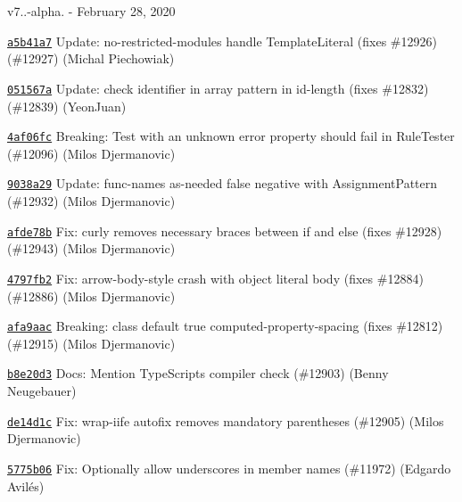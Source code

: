 v7..-\/alpha. -\/ February 28, 2020


\begin{DoxyItemize}
\item \href{https://github.com/eslint/eslint/commit/a5b41a75b57572e97476b06ad39b768e15b9d844}{\texttt{ {\ttfamily a5b41a7}}} Update\+: no-\/restricted-\/modules handle Template\+Literal (fixes \#12926) (\#12927) (Michal Piechowiak)
\item \href{https://github.com/eslint/eslint/commit/051567adca7ca56d691bcda76f54ed72e3eae367}{\texttt{ {\ttfamily 051567a}}} Update\+: check identifier in array pattern in id-\/length (fixes \#12832) (\#12839) (Yeon\+Juan)
\item \href{https://github.com/eslint/eslint/commit/4af06fc49029dac5c9acfd53f01fd9527bfbb4aa}{\texttt{ {\ttfamily 4af06fc}}} Breaking\+: Test with an unknown error property should fail in Rule\+Tester (\#12096) (Milos Djermanovic)
\item \href{https://github.com/eslint/eslint/commit/9038a29569548c0563c29dbe9f7dae280ff3addd}{\texttt{ {\ttfamily 9038a29}}} Update\+: func-\/names {\ttfamily as-\/needed} false negative with Assignment\+Pattern (\#12932) (Milos Djermanovic)
\item \href{https://github.com/eslint/eslint/commit/afde78b125747ce5ad9e5f871122a0d370dd0152}{\texttt{ {\ttfamily afde78b}}} Fix\+: curly removes necessary braces between if and else (fixes \#12928) (\#12943) (Milos Djermanovic)
\item \href{https://github.com/eslint/eslint/commit/4797fb2c29db97bc5cd23b40e5a9235fef1ea06a}{\texttt{ {\ttfamily 4797fb2}}} Fix\+: arrow-\/body-\/style crash with object literal body (fixes \#12884) (\#12886) (Milos Djermanovic)
\item \href{https://github.com/eslint/eslint/commit/afa9aac6de9444e935a55b46311e5b5a58f86063}{\texttt{ {\ttfamily afa9aac}}} Breaking\+: class default {\ttfamily true} computed-\/property-\/spacing (fixes \#12812) (\#12915) (Milos Djermanovic)
\item \href{https://github.com/eslint/eslint/commit/b8e20d33b7d6645266beef09cd231afaf5054328}{\texttt{ {\ttfamily b8e20d3}}} Docs\+: Mention Type\+Script\textquotesingle{}s compiler check (\#12903) (Benny Neugebauer)
\item \href{https://github.com/eslint/eslint/commit/de14d1ce0cf422b4100a686abb906f53fbf905b3}{\texttt{ {\ttfamily de14d1c}}} Fix\+: wrap-\/iife autofix removes mandatory parentheses (\#12905) (Milos Djermanovic)
\item \href{https://github.com/eslint/eslint/commit/5775b06a74573cbe068bea56b1d2376421f5e831}{\texttt{ {\ttfamily 5775b06}}} Fix\+: Optionally allow underscores in member names (\#11972) (Edgardo Avilés)

\end{DoxyItemize}
